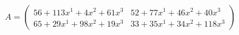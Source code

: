 \documentclass[preview]{standalone}
\begin{document}
\begin{align*}
A = \begin{pmatrix}56 + 113x^{1} + 4x^{2} + 61x^{3} & 52 + 77x^{1} + 46x^{2} + 40x^{3} \\ 65 + 29x^{1} + 98x^{2} + 19x^{3} & 33 + 35x^{1} + 34x^{2} + 118x^{3}\end{pmatrix}
\end{align*}
\end{document}

